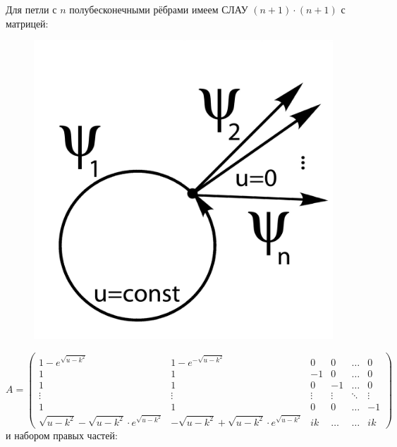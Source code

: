 \documentclass[a4 paper, 12 pt]{extarticle}
\begin{document}
   Для петли с $n$ полубесконечными рёбрами имеем СЛАУ $(n+1)\cdot (n+1)$ с матрицей:
   \begin{figure}
   	\centering
   	\includegraphics[scale=0.5]{n-arrow.jpg}
   \end{figure}
   \[ A = \left(\begin{smallmatrix}
   1-e^{\sqrt{u-k^2}} & 1-e^{-\sqrt{u-k^2}} & 0 & 0 & \ldots & 0 \\
   1 & 1 & -1  & 0 & \ldots & 0 \\
   1 & 1 & 0  & -1 & \ldots & 0 \\
   \vdots & \vdots & \vdots  & \vdots & \ddots & \vdots \\
   1 & 1 & 0  & 0 & \ldots & -1 \\
   \sqrt{u-k^2}-\sqrt{u-k^2} \cdot e^{\sqrt{u-k^2}} & -\sqrt{u-k^2}+\sqrt{u-k^2} \cdot e^{\sqrt{u-k^2}} & ik & \ldots & \ldots & ik
   \end{smallmatrix}\right)\]
   и набором правых частей:
\end{document}
